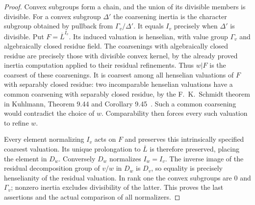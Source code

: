 \begin{proof}
Convex subgroups form a chain, and the union of its divisible
members is divisible. For a convex subgroup $\Delta'$ the
coarsening inertia is the character subgroup obtained by pullback
from $\Gamma_v/\Delta'$. It equals $I_v$ precisely when
$\Delta'$ is divisible. Put $F=\overline L^{I_v}$. Its induced
valuation is henselian, with value group $\Gamma_v$ and
algebraically closed residue field. The coarsenings with
algebraically closed residue are precisely those with divisible
convex kernel, by the already proved inertia computation applied
to their residual refinements. Thus $w|F$ is the coarsest of
these coarsenings. It is coarsest among all henselian valuations
of $F$ with separably closed residue: two incomparable henselian
valuations have a common coarsening with separably closed
residue, by the F.~K.~Schmidt theorem in Kuhlmann, Theorem 9.44
and Corollary 9.45~\cite{F-KuhlmannHensel}. Such a common
coarsening would contradict the choice of $w$. Comparability
then forces every such valuation to refine $w$.

Every element normalizing $I_v$ acts on $F$ and preserves this
intrinsically specified coarsest valuation. Its unique
prolongation to $\overline L$ is therefore preserved, placing
the element in $D_w$. Conversely $D_w$ normalizes $I_w=I_v$.
The inverse image of the residual decomposition group of $v/w$
in $D_w$ is $D_v$, so equality is precisely henselianity of the
residual valuation. In rank one the convex subgroups are $0$
and $\Gamma_v$; nonzero inertia excludes divisibility of the
latter. This proves the last assertions and the actual comparison
of all normalizers.
\end{proof}

